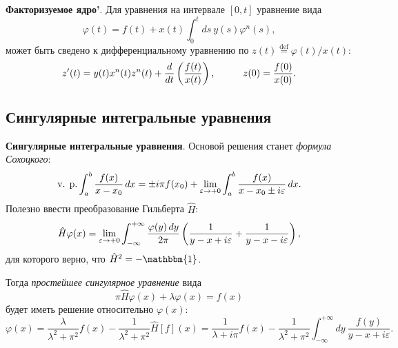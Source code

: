 \textbf{Факторизуемое ядро'}. Для уравнения на интервале $[0, t]$ уравнение вида
\begin{equation*}
	\varphi(t) = f(t) + x(t) \int_{0}^{t} ds\ y(s) \varphi^n (s),
\end{equation*}
может быть сведено к дифференциальному уравнению по $z(t) \overset{\mathrm{def}}{=} \varphi(t) / x(t)$:
\begin{equation*}
	z'(t) = y(t) x^n (t) z^n (t) + \frac{d }{d t} \left(\frac{f(t)}{x(t)}\right),
	\hspace{10 mm} 
	z(0) = \frac{f(0)}{x(0)}.
\end{equation*}


\subsection*{Сингулярные интегральные уравнения}

\textbf{Сингулярные интегральные уравнения}. Основой решения станет \textit{формула Сохоцкого}:
\begin{equation}
		\text{v. p.} \int_{a}^{b} \frac{f(x)}{x-x_0} \, d x = 
		\pm i \pi f(x_0) + \lim_{\varepsilon \to + 0} \int_{a}^{b} \frac{f(x)}{x-x_0 \pm i \varepsilon} \, d x.
\end{equation}
Полезно ввести преобразование Гильберта $\hat{H}$:
\begin{align*}
	\hat{H} \varphi(x) 
	=
	\lim_{\varepsilon \to + 0} \int_{-\infty}^{+\infty} \frac{\varphi(y) \, d y}{2\pi} \left(
		\frac{1}{y-x + i \varepsilon} + \frac{1}{y-x-i \varepsilon}
	\right),
\end{align*}
для которого верно, что $\hat{H}^2 = - \mathbbm{1}$.

Тогда \textit{простейшее сингулярное уравнение} вида
\begin{equation}
	\pi \hat{H} \varphi(x)  + \lambda \varphi(x) = f(x)
\end{equation}
будет иметь решение относительно $\varphi(x)$:
\begin{equation}
	 \varphi(x) = \frac{\lambda}{\lambda^2 + \pi^2} f(x) - \frac{1}{\lambda^2 + \pi^2} \hat{H}[f](x) = \frac{1}{\lambda + i \pi} f(x) - \frac{1}{\lambda^2 + \pi^2} \int_{-\infty}^{+\infty}  dy\ \frac{f(y)}{y-x + i \varepsilon}.
\end{equation}

